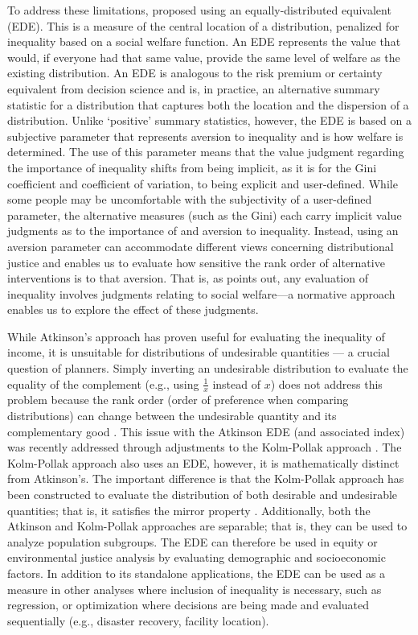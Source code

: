 \documentclass[final,3p,times,onecolumn,sort&compress]{elsarticle}
\begin{document}
To address these limitations, \cite{Atkinson1970-mr} proposed using an equally-distributed equivalent (EDE).
This is a measure of the central location of a distribution, penalized for inequality based on a social welfare function.
An EDE represents the value that would, if everyone had that same value, provide the same level of welfare as the existing distribution.
An EDE is analogous to the risk premium or certainty equivalent from decision science and is, in practice, an alternative summary statistic for a distribution that captures both the location and the dispersion of a distribution.
Unlike ‘positive’ summary statistics, however, the EDE is based on a subjective parameter that represents aversion to inequality and is how welfare is determined.
The use of this parameter means that the value judgment regarding the importance of inequality shifts from being implicit, as it is for the Gini coefficient and coefficient of variation, to being explicit and user-defined.
While some people may be uncomfortable with the subjectivity of a user-defined parameter, the alternative measures (such as the Gini) each carry implicit value judgments as to the importance of and aversion to inequality.
Instead, using an aversion parameter can accommodate different views concerning distributional justice and enables us to evaluate how sensitive the rank order of alternative interventions is to that aversion.
That is, as \cite{Atkinson1970-mr} points out, any evaluation of inequality involves judgments relating to social welfare---a normative approach enables us to explore the effect of these judgments.

While Atkinson's approach has proven useful for evaluating the inequality of income, it is unsuitable for distributions of undesirable quantities \citep{Cox2012-lg, Sheriff2020-ge, Maguire2011-fi, Fann2011-hd} — a crucial question of planners.
Simply inverting an undesirable distribution to evaluate the equality of the complement (e.g., using $\frac{1}{x}$ instead of $x$) does not address this problem because the rank order (order of preference when comparing distributions) can change between the undesirable quantity and its complementary good \citep{Sheriff2020-ge, Cox2012-lg, Erreygers2009-is}.
This issue with the Atkinson EDE (and associated index) was recently addressed through adjustments to the Kolm-Pollak approach \citep{Sheriff2020-ge}. 
The Kolm-Pollak approach also uses an EDE, however, it is mathematically distinct from Atkinson’s. 
The important difference is that the Kolm-Pollak approach has been constructed to evaluate the distribution of both desirable and undesirable quantities; that is, it satisfies the mirror property \citep{Sheriff2020-ge}. 
Additionally, both the Atkinson and Kolm-Pollak approaches are separable; that is, they can be used to analyze population subgroups. 
The EDE can therefore be used in equity or environmental justice analysis by evaluating demographic and socioeconomic factors. 
In addition to its standalone applications, the EDE can be used as a measure in other analyses where inclusion of inequality is necessary, such as regression, or optimization where decisions are being made and evaluated sequentially (e.g., disaster recovery, facility location).
\end{document}
